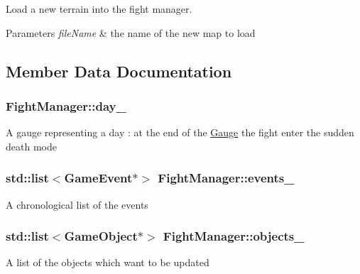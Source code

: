 Load a new terrain into the fight manager. 


\begin{DoxyParams}{Parameters}
{\em file\+Name} & the name of the new map to load \\
\hline
\end{DoxyParams}


\subsection{Member Data Documentation}
\subsubsection[{\texorpdfstring{day\+\_\+}{day_}}]{ Fight\+Manager\+::day\+\_\+\hspace{0.3cm}{\ttfamily [protected]}}\hypertarget{class_fight_manager_ad929270ed8c1733e92b10b617b1e1b7d}{}\label{class_fight_manager_ad929270ed8c1733e92b10b617b1e1b7d}
A gauge representing a day \+: at the end of the \hyperlink{class_gauge}{Gauge} the fight enter the sudden death mode 
\subsubsection[{\texorpdfstring{events\+\_\+}{events_}}]{\setlength{\rightskip}{0pt plus 5cm}std\+::list$<${\bf Game\+Event}$\ast$$>$ Fight\+Manager\+::events\+\_\+\hspace{0.3cm}{\ttfamily [protected]}}\hypertarget{class_fight_manager_a09acc794f05e6281f067bbcecd5c0e7e}{}\label{class_fight_manager_a09acc794f05e6281f067bbcecd5c0e7e}
A chronological list of the events 
\subsubsection[{\texorpdfstring{objects\+\_\+}{objects_}}]{\setlength{\rightskip}{0pt plus 5cm}std\+::list$<${\bf Game\+Object}$\ast$$>$ Fight\+Manager\+::objects\+\_\+\hspace{0.3cm}{\ttfamily [protected]}}\hypertarget{class_fight_manager_a347a9e8860763700c12f4ceaa9c95616}{}\label{class_fight_manager_a347a9e8860763700c12f4ceaa9c95616}
A list of the objects which want to be updated 
